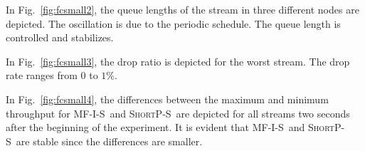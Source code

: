 \documentclass[11pt]{article}
\newenvironment{proof sketch}[1]{\noindent {\emph{Proof sketch of #1:}}}{\hfill \qed}
\newcommand{\algA}{\textsc{MF-I-S}}
\newcommand{\algBS}{\textsc{ShortP-S}}
\begin{document}
In Fig.~\ref{fig:fcsmall2}, the queue lengths of the stream in three
different nodes are depicted.  The oscillation is due to the periodic
schedule. The queue length is controlled and stabilizes.

In Fig.~\ref{fig:fcsmall3}, the drop ratio is depicted for the worst
stream. The drop rate ranges from $0$ to $1$\%.

In Fig.~\ref{fig:fcsmall4}, the differences between the maximum and
minimum throughput for \algA\ and \algBS\ are depicted for all streams
two seconds after the beginning of the experiment.  It is evident that
\algA\ and \algBS\ are stable since the differences are smaller.

\end{document}
